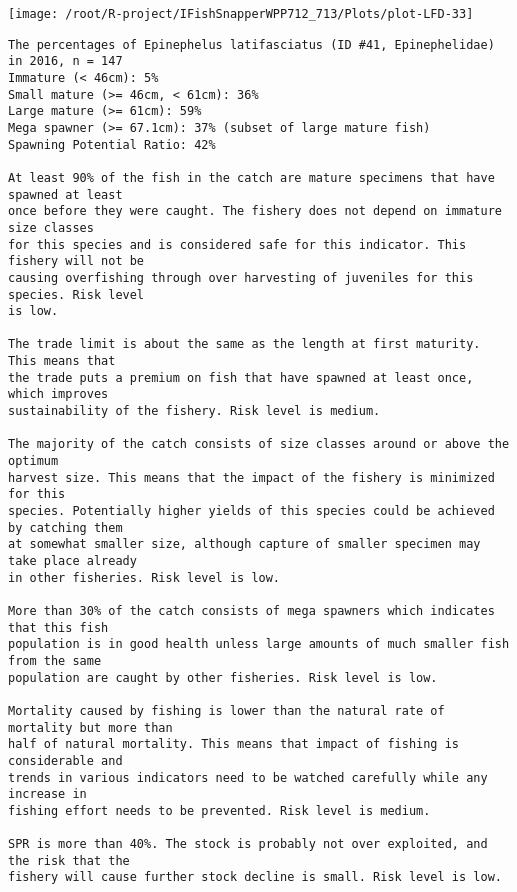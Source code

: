 \documentclass{report}\usepackage[]{graphicx}\usepackage[]{color}
\makeatletter
\def\maxwidth{ %
  \ifdim\Gin@nat@width>\linewidth
    \linewidth
  \else
    \Gin@nat@width
  \fi
}
\newenvironment{kframe}{%
 \def\at@end@of@kframe{}%
 \ifinner\ifhmode%
  \def\at@end@of@kframe{\end{minipage}}%
  \begin{minipage}{\columnwidth}%
 \fi\fi%
 \def\FrameCommand##1{\hskip\@totalleftmargin \hskip-\fboxsep
 \colorbox{shadecolor}{##1}\hskip-\fboxsep
     \hskip-\linewidth \hskip-\@totalleftmargin \hskip\columnwidth}%
 \MakeFramed {\advance\hsize-\width
   \@totalleftmargin\z@ \linewidth\hsize
   \@setminipage}}%
 {\par\unskip\endMakeFramed%
 \at@end@of@kframe}
\newenvironment{knitrout}{}{} %
\makeatother
\begin{document}
\begin{knitrout}
\texttt{[image: /root/R-project/IFishSnapperWPP712\_713/Plots/plot-LFD-33]} 
\begin{kframe}\begin{verbatim}
The percentages of Epinephelus latifasciatus (ID #41, Epinephelidae) in 2016, n = 147
Immature (< 46cm): 5%
Small mature (>= 46cm, < 61cm): 36%
Large mature (>= 61cm): 59%
Mega spawner (>= 67.1cm): 37% (subset of large mature fish)
Spawning Potential Ratio: 42%
 
At least 90% of the fish in the catch are mature specimens that have spawned at least
once before they were caught. The fishery does not depend on immature size classes
for this species and is considered safe for this indicator. This fishery will not be
causing overfishing through over harvesting of juveniles for this species. Risk level
is low.

The trade limit is about the same as the length at first maturity.  This means that
the trade puts a premium on fish that have spawned at least once, which improves
sustainability of the fishery. Risk level is medium.

The majority of the catch consists of size classes around or above the optimum
harvest size. This means that the impact of the fishery is minimized for this
species. Potentially higher yields of this species could be achieved by catching them
at somewhat smaller size, although capture of smaller specimen may take place already
in other fisheries. Risk level is low.

More than 30% of the catch consists of mega spawners which indicates that this fish
population is in good health unless large amounts of much smaller fish from the same
population are caught by other fisheries. Risk level is low.
 
Mortality caused by fishing is lower than the natural rate of mortality but more than
half of natural mortality. This means that impact of fishing is considerable and
trends in various indicators need to be watched carefully while any increase in
fishing effort needs to be prevented. Risk level is medium.
 
SPR is more than 40%. The stock is probably not over exploited, and the risk that the
fishery will cause further stock decline is small. Risk level is low.
 

\end{verbatim}
\end{kframe}
\end{knitrout}
\end{document}

